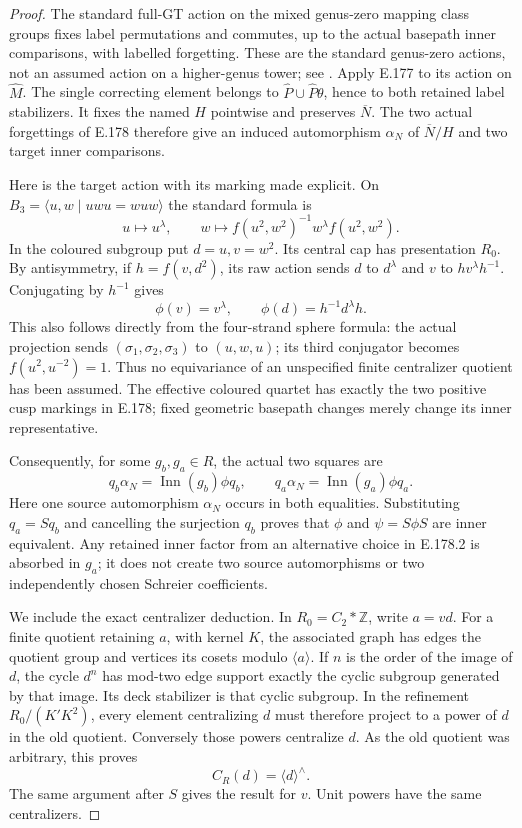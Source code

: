 \begin{proof}
The standard full-GT action on the mixed genus-zero
mapping class groups fixes label permutations and
commutes, up to the actual basepath inner comparisons,
with labelled forgetting.  These are the standard
genus-zero actions, not an assumed action on a
higher-genus tower; see
\cite[\S1, equation (1.1), author pp.2--3]
{SymNakamuraSchneps2000}.
Apply E.177 to its action on \(\widehat M\).
The single correcting element belongs to
\(\widehat P\cup\widehat P\theta\), hence to
both retained label stabilizers.  It fixes
the named \(H\) pointwise and preserves
\(\overline N\).  The two actual forgettings
of E.178 therefore give an induced
automorphism \(\alpha_N\) of \(\overline N/H\)
and two target inner comparisons.

Here is the target action with its marking made
explicit.  On \(B_3=\langle u,w\mid uwu=wuw\rangle\)
the standard formula is
\[
 u\longmapsto u^\lambda,\qquad
 w\longmapsto f(u^2,w^2)^{-1}w^\lambda f(u^2,w^2).
\tag{E.179.3}
\]
In the coloured subgroup put \(d=u,v=w^2\).
Its central cap has presentation \(R_0\).
By antisymmetry, if \(h=f(v,d^2)\), its raw
action sends \(d\) to \(d^\lambda\) and
\(v\) to \(h v^\lambda h^{-1}\).  Conjugating
by \(h^{-1}\) gives
\[
        \phi(v)=v^\lambda,\qquad
        \phi(d)=h^{-1}d^\lambda h .
\tag{E.179.4}
\]
This also follows directly from the four-strand
sphere formula: the actual projection sends
\((\sigma_1,\sigma_2,\sigma_3)\) to \((u,w,u)\);
its third conjugator becomes
\(f(u^2,u^{-2})=1\).
Thus no equivariance of an unspecified finite
centralizer quotient has been assumed.
The effective coloured quartet has exactly the
two positive cusp markings in E.178; fixed
geometric basepath changes merely change its
inner representative.

Consequently, for some \(g_b,g_a\in R\), the
actual two squares are
\[
 q_b\alpha_N=\operatorname{Inn}(g_b)\phi q_b,\qquad
 q_a\alpha_N=\operatorname{Inn}(g_a)\phi q_a .
\tag{E.179.5}
\]
Here one source automorphism \(\alpha_N\) occurs
in both equalities.  Substituting \(q_a=S q_b\)
and cancelling the surjection \(q_b\) proves
that \(\phi\) and \(\psi=S\phi S\) are inner
equivalent.  Any retained inner factor from
an alternative choice in E.178.2 is absorbed
in \(g_a\); it does not create two source
automorphisms or two independently chosen
Schreier coefficients.

We include the exact centralizer deduction.
In \(R_0=C_2*\mathbb Z\), write \(a=vd\).
For a finite quotient retaining \(a\), with
kernel \(K\), the associated graph has edges
the quotient group and vertices its cosets
modulo \(\langle a\rangle\).
If \(n\) is the order of the image of \(d\),
the cycle \(d^n\) has mod-two edge support
exactly the cyclic subgroup generated by
that image.  Its deck stabilizer is that
cyclic subgroup.  In the refinement
\(R_0/(K'K^2)\), every element centralizing
\(d\) must therefore project to a power of
\(d\) in the old quotient.  Conversely those
powers centralize \(d\).  As the old quotient
was arbitrary, this proves
\[
                    C_R(d)=\langle d\rangle^{\wedge}.
\tag{E.179.6}
\]
The same argument after \(S\) gives the result
for \(v\).  Unit powers have the same
centralizers.


\end{proof}
